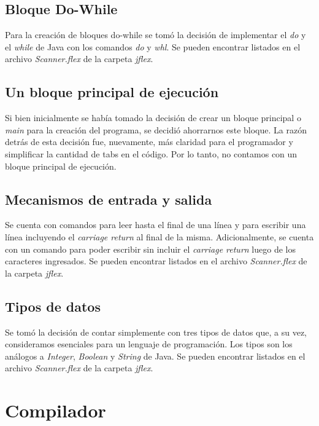 \documentclass{article}
\begin{document}
\subsection{Bloque Do-While}
\par Para la creación de bloques do-while se tomó la decisión de implementar el \textit{do} y el \textit{while} de Java con los comandos \textit{do} y \textit{whl}. Se pueden encontrar listados en el archivo \textit{Scanner.flex} de la carpeta \textit{jflex}.
\subsection{Un bloque principal de ejecución}
\par Si bien inicialmente se había tomado la decisión de crear un bloque principal o \textit{main} para la creación del programa, se decidió ahorrarnos este bloque. La razón detrás de esta decisión fue, nuevamente, más claridad para el programador y simplificar la cantidad de tabs en el código. Por lo tanto, no contamos con un bloque principal de ejecución.
\subsection{Mecanismos de entrada y salida}
\par Se cuenta con comandos para leer hasta el final de una línea y para escribir una línea incluyendo el \textit{carriage return} al final de la misma. Adicionalmente, se cuenta con un comando para poder escribir sin incluir el \textit{carriage return} luego de los caracteres ingresados. Se pueden encontrar listados en el archivo \textit{Scanner.flex} de la carpeta \textit{jflex}.
\subsection{Tipos de datos}
\par Se tomó la decisión de contar simplemente con tres tipos de datos que, a su vez, consideramos esenciales para un lenguaje de programación. Los tipos son los análogos a  \textit{Integer}, \textit{Boolean} y \textit{String} de Java. Se pueden encontrar listados en el archivo \textit{Scanner.flex} de la carpeta \textit{jflex}.
\clearpage

\section{Compilador}
\end{document}
